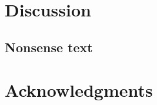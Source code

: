 \documentclass[11pt,letterpaper]{article}
\begin{document}
\section*{Discussion}
\label{sec:org0f54f7f}
\subsection*{Nonsense text}
\label{sec:orgf3a010c}
\lipsum[1-10]


\section*{Acknowledgments}
\label{sec:org1e7d21a}
\subsection*{}
\label{sec:org3faaaf1}
\newpage



\subsection*{}
\label{sec:org964cc9a}
\newpage
\listoftables
\end{document}
